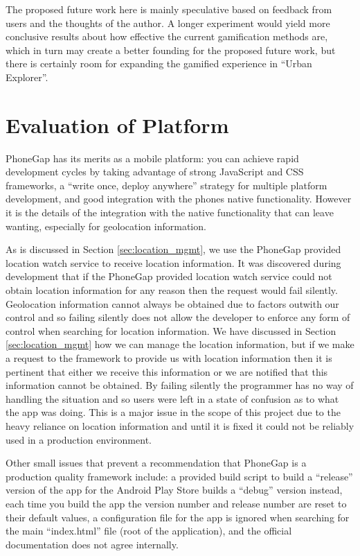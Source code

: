 The proposed future work here is mainly speculative based on feedback
from users and the thoughts of the author. A longer experiment would
yield more conclusive results about how effective the current
gamification methods are, which in turn may create a better founding
for the proposed future work, but there is certainly room for
expanding the gamified experience in ``Urban Explorer''.


\section{Evaluation of Platform}
PhoneGap has its merits as a mobile platform: you can achieve rapid
development cycles by taking advantage of strong JavaScript and CSS
frameworks, a ``write once, deploy anywhere'' strategy for multiple
platform development, and good integration with the phones native
functionality. However it is the details of the integration with the
native functionality that can leave wanting, especially for
geolocation information.

As is discussed in Section \ref{sec:location_mgmt}, we use the PhoneGap
provided location watch service to receive location information. It
was discovered during development that if the PhoneGap provided
location watch service could not obtain location information for any
reason then the request would fail silently. Geolocation information
cannot always be obtained due to factors outwith our control and so
failing silently does not allow the developer to enforce any form of
control when searching for location information. We have discussed in
Section \ref{sec:location_mgmt} how we can manage the location
information, but if we make a request to the framework to provide us
with location information then it is pertinent that either we receive
this information or we are notified that this information cannot be
obtained. By failing silently the programmer has no way of handling
the situation and so users were left in a state of confusion as to
what the app was doing. This is a major issue in the scope of this
project due to the heavy reliance on location information and until it
is fixed it could not be reliably used in a production environment. 

Other small issues that prevent a recommendation that PhoneGap is a 
production quality framework include: a provided build script to build
a ``release'' version of the app for the Android Play Store builds a
``debug'' version instead, each time you build the app the version
number and release number are reset to their default values, a
configuration file for the app is ignored when searching for the main
``index.html'' file (root of the application), and the official
documentation does not agree internally\cite{phonegap_install,
  phonegap_cli, phonegap_geolocationAccessingFeature}.

